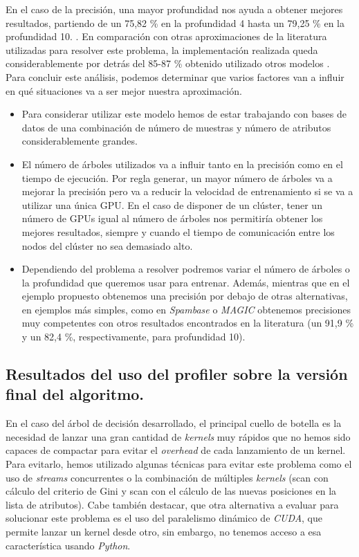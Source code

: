 En el caso de la precisión, una mayor profundidad nos ayuda a obtener mejores resultados, partiendo de un 75,82 \% en la profundidad 4 hasta un 79,25 \% en la profundidad 10. . En comparación con otras aproximaciones de la literatura utilizadas para resolver este problema, la implementación realizada queda considerablemente por detrás del 85-87 \% obtenido utilizado otros modelos \cite{susy}. \\

Para concluir este análisis, podemos determinar que varios factores van a influir en qué situaciones va a ser mejor nuestra aproximación.
\begin{itemize}
\item Para considerar utilizar este modelo hemos de estar trabajando con bases de datos de una combinación de número de muestras y número de atributos considerablemente grandes.
\item El número de árboles utilizados va a influir tanto en la precisión como en el tiempo de ejecución. Por regla generar, un mayor número de árboles va a mejorar la precisión pero va a reducir la velocidad de entrenamiento si se va a utilizar una única GPU. En el caso de disponer de un clúster, tener un número de GPUs igual al número de árboles nos permitiría obtener los mejores resultados, siempre y cuando el tiempo de comunicación entre los nodos del clúster no sea demasiado alto.
\item Dependiendo del problema a resolver podremos variar el número de árboles o la profundidad que queremos usar para entrenar. Además, mientras que en el ejemplo propuesto obtenemos una precisión por debajo de otras alternativas, en ejemplos más simples, como en \textit{Spambase} \cite{spambase} o \textit{MAGIC} \cite{magic04} obtenemos precisiones muy competentes con otros resultados encontrados en la literatura (un 91,9 \% y un 82,4 \%, respectivamente, para profundidad 10).
\end{itemize}

\subsection{Resultados del uso del profiler sobre la versión final del algoritmo.}
En el caso del árbol de decisión desarrollado, el principal cuello de botella es la necesidad de lanzar una gran cantidad de \textit{kernels} muy rápidos que no hemos sido capaces de compactar para evitar el \textit{overhead} de cada lanzamiento de un kernel. Para evitarlo, hemos utilizado algunas técnicas para evitar este problema como el uso de \textit{streams} concurrentes o la combinación de múltiples \textit{kernels} (scan con cálculo del criterio de Gini y scan con el cálculo de las nuevas posiciones en la lista de atributos). Cabe también destacar, que otra alternativa a evaluar para solucionar este problema es el uso del paralelismo dinámico de \textit{CUDA}, que permite lanzar un kernel desde otro, sin embargo, no tenemos acceso a esa característica usando \textit{Python}.\\

